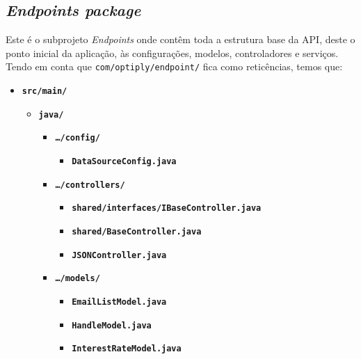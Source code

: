 \newpage

\subsection{\textit{\textit{Endpoints} package}}\label{endp}

Este é o subprojeto \textit{Endpoints} onde contêm toda a estrutura base da API, deste o ponto inicial da aplicação, às configurações, modelos, controladores e serviços. Tendo em conta que \texttt{com/optiply/endpoint/} fica como reticências, temos que:

\begin{itemize}
        \item \texttt{\textbf{src/main/}}\begin{itemize}
                      \item \texttt{\textbf{java/}}\begin{itemize}
                                    \item \texttt{\textbf{\ldots/config/}}\begin{itemize}
                                                  \item \texttt{\textbf{DataSourceConfig.java}}
                                          \end{itemize}
                                    \item \texttt{\textbf{\ldots/controllers/}}\begin{itemize}
                                                  \item \texttt{\textbf{shared/interfaces/IBaseController.java}}
                                                  \item \texttt{\textbf{shared/BaseController.java}}
                                                  \item \texttt{\textbf{JSONController.java}}
                                          \end{itemize}
                                    \item \texttt{\textbf{\ldots/models/}}\begin{itemize}
                                                  \item \texttt{\textbf{EmailListModel.java}}
                                                  \item \texttt{\textbf{HandleModel.java}}
                                                  \item \texttt{\textbf{InterestRateModel.java}}

\end{itemize}
\end{itemize}
\end{itemize}
\end{itemize}
